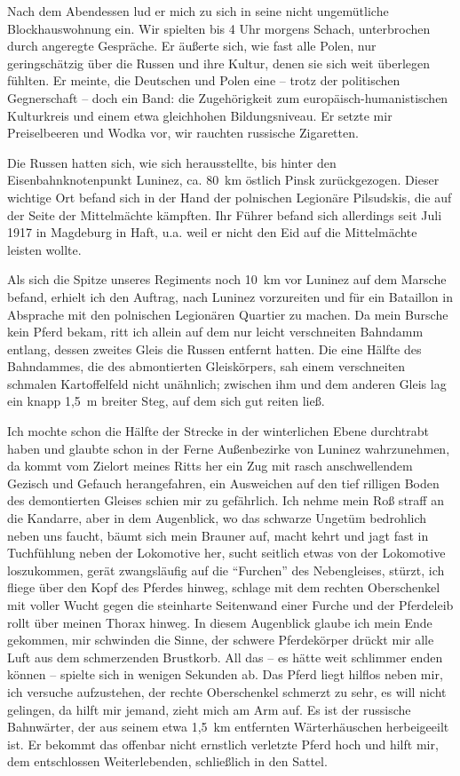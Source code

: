 \documentclass[a5paper,pagesize,10pt,twoside=true]{scrbook}
\begin{document}
Nach dem Abendessen lud er mich zu sich in seine nicht ungemütliche Blockhauswohnung ein. Wir spielten bis 4 Uhr morgens Schach, unterbrochen durch angeregte Gespräche. Er äußerte sich, wie fast alle Polen, nur geringschätzig über die Russen und ihre Kultur, denen sie sich weit überlegen fühlten. Er meinte, die Deutschen und Polen eine -- trotz der politischen Gegnerschaft -- doch ein Band: die Zugehörigkeit zum europäisch-humanistischen Kulturkreis und einem etwa gleichhohen Bildungsniveau. Er setzte mir Preiselbeeren und Wodka vor, wir rauchten russische Zigaretten.

Die Russen hatten sich, wie sich herausstellte, bis hinter den Eisenbahnknotenpunkt Luninez, ca. 80~km östlich Pinsk zurückgezogen. Dieser wichtige Ort befand sich in der Hand der polnischen Legionäre Pilsudskis, die auf der Seite der Mittelmächte kämpften. Ihr Führer befand sich allerdings seit Juli 1917 in Magdeburg in Haft, u.a. weil er nicht den Eid auf die Mittelmächte leisten wollte.

Als sich die Spitze unseres Regiments noch 10~km vor Luninez auf dem Marsche befand, erhielt ich den Auftrag, nach Luninez vorzureiten und für ein Bataillon in Absprache mit den polnischen Legionären Quartier zu machen. Da mein Bursche kein Pferd bekam, ritt ich allein auf dem nur leicht verschneiten Bahndamm entlang, dessen zweites Gleis die Russen entfernt hatten. Die eine Hälfte des Bahndammes, die des abmontierten Gleiskörpers, sah einem verschneiten schmalen Kartoffelfeld nicht unähnlich; zwischen ihm und dem anderen Gleis lag ein knapp 1,5~m breiter Steg, auf dem sich gut reiten ließ.

Ich mochte schon die Hälfte der Strecke in der winterlichen Ebene durchtrabt haben und glaubte schon in der Ferne Außenbezirke von Luninez wahrzunehmen, da kommt vom Zielort meines Ritts her ein Zug mit rasch anschwellendem Gezisch und Gefauch herangefahren, ein Ausweichen auf den tief rilligen Boden des demontierten Gleises schien mir zu gefährlich. Ich nehme mein Roß straff an die Kandarre, aber in dem Augenblick, wo das schwarze Ungetüm bedrohlich neben uns faucht, bäumt sich mein Brauner auf, macht kehrt und jagt fast in Tuchfühlung neben der Lokomotive her, sucht seitlich etwas von der Lokomotive loszukommen, gerät zwangsläufig auf die \enquote{Furchen} des Nebengleises, stürzt, ich fliege über den Kopf des Pferdes hinweg, schlage mit dem rechten Oberschenkel mit voller Wucht gegen die steinharte Seitenwand einer Furche und der Pferdeleib rollt über meinen Thorax hinweg. In diesem Augenblick glaube ich mein Ende gekommen, mir schwinden die Sinne, der schwere Pferdekörper drückt mir alle Luft aus dem schmerzenden Brustkorb. All das -- es hätte weit schlimmer enden können -- spielte sich in wenigen Sekunden ab. Das Pferd liegt hilflos neben mir, ich versuche aufzustehen, der rechte Oberschenkel schmerzt zu sehr, es will nicht gelingen, da hilft mir jemand, zieht mich am Arm auf. Es ist der russische Bahnwärter, der aus seinem etwa 1,5~km entfernten Wärterhäuschen herbeigeeilt ist. Er bekommt das offenbar nicht ernstlich verletzte Pferd hoch und hilft mir, dem entschlossen Weiterlebenden, schließlich in den Sattel.
\end{document}
